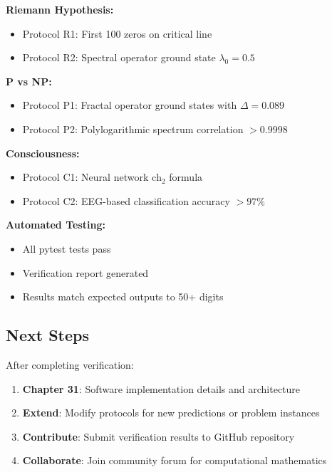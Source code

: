 \begin{tcolorbox}[colback=green!10!white, colframe=green!75!black, title=Complete Verification Checklist]
\textbf{Riemann Hypothesis:}
\begin{itemize}
\item[$\square$] Protocol R1: First 100 zeros on critical line
\item[$\square$] Protocol R2: Spectral operator ground state $\lambda_0 = 0.5$
\end{itemize}

\textbf{P vs NP:}
\begin{itemize}
\item[$\square$] Protocol P1: Fractal operator ground states with $\Delta = 0.089$
\item[$\square$] Protocol P2: Polylogarithmic spectrum correlation $> 0.9998$
\end{itemize}

\textbf{Consciousness:}
\begin{itemize}
\item[$\square$] Protocol C1: Neural network $\text{ch}_2$ formula
\item[$\square$] Protocol C2: EEG-based classification accuracy $> 97\%$
\end{itemize}

\textbf{Automated Testing:}
\begin{itemize}
\item[$\square$] All pytest tests pass
\item[$\square$] Verification report generated
\item[$\square$] Results match expected outputs to 50+ digits
\end{itemize}
\end{tcolorbox}

\subsection{Next Steps}

After completing verification:
\begin{enumerate}
\item \textbf{Chapter 31}: Software implementation details and architecture
\item \textbf{Extend}: Modify protocols for new predictions or problem instances
\item \textbf{Contribute}: Submit verification results to GitHub repository
\item \textbf{Collaborate}: Join community forum for computational mathematics
\end{enumerate}

